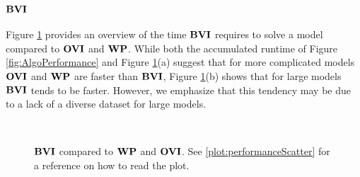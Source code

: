 \subsubsection*{\underline{$\mathbf{BVI}$}}

Figure \ref{fig:BVIvsWPvsOVI} provides an overview of the time $\mathbf{BVI}$ requires to solve a model compared to $\mathbf{OVI}$ and $\mathbf{WP}$.
While both the accumulated runtime of Figure \ref{fig:AlgoPerformance} and Figure \ref{fig:BVIvsWPvsOVI}(a)
suggest that for more complicated models $\mathbf{OVI}$ and $\mathbf{WP}$ are faster than $\mathbf{BVI}$, 
Figure \ref{fig:BVIvsWPvsOVI}(b) shows that for large models $\mathbf{BVI}$ tends to be faster. 
However, we emphasize that this tendency may be due to a lack of a diverse dataset for large models.

\begin{figure}[h!]
    \centering
    \
    \caption{$\mathbf{BVI}$ compared to $\mathbf{WP}$ and $\mathbf{OVI}$. See \ref{plot:performanceScatter} for a reference on how to read the plot.}%
    \label{fig:BVIvsWPvsOVI}%
    \end{figure}
\FloatBarrier

